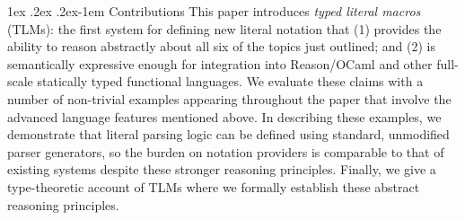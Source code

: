 \documentclass[acmsmall]{acmart}
\makeatletter
\renewcommand{\paragraph}{%
  \@startsection{paragraph}{4}%
  {\z@}{1ex \@plus .2ex \@minus .2ex}{-1em}%
  {\normalfont\normalsize\bfseries}%
}
\makeatother
\begin{document}

\paragraph{Contributions} This paper introduces \emph{typed literal macros} (TLMs): the first system for defining new literal notation that (1) provides the ability to reason abstractly about all six of the topics just outlined; and (2) is semantically expressive enough for integration into Reason/OCaml and other full-scale statically typed functional languages. We evaluate these claims with a number of non-trivial examples appearing throughout the paper that involve the advanced language features mentioned above. In describing these examples, we demonstrate that literal parsing logic can be defined using standard, unmodified parser generators, so the burden on notation providers is comparable to that of existing systems despite these stronger reasoning principles.  Finally, we give a type-theoretic account of TLMs where we formally establish these abstract reasoning principles. %


\end{document}
